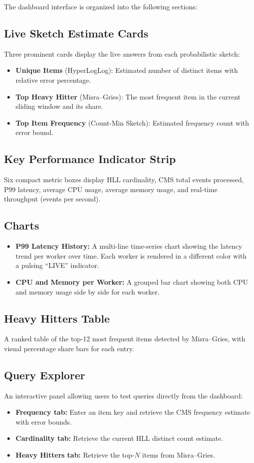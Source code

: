 The dashboard interface is organized into the following sections:

\subsection{Live Sketch Estimate Cards}
Three prominent cards display the live answers from each probabilistic sketch:
\begin{itemize}
    \item \textbf{Unique Items} (HyperLogLog): Estimated number of distinct items with relative error percentage.
    \item \textbf{Top Heavy Hitter} (Misra--Gries): The most frequent item in the current sliding window and its share.
    \item \textbf{Top Item Frequency} (Count-Min Sketch): Estimated frequency count with error bound.
\end{itemize}

\subsection{Key Performance Indicator Strip}
Six compact metric boxes display HLL cardinality, CMS total events processed, P99 latency, average CPU usage, average memory usage, and real-time throughput (events per second).

\subsection{Charts}
\begin{itemize}
    \item \textbf{P99 Latency History:} A multi-line time-series chart showing the latency trend per worker over time. Each worker is rendered in a different color with a pulsing ``LIVE'' indicator.
    \item \textbf{CPU and Memory per Worker:} A grouped bar chart showing both CPU and memory usage side by side for each worker.
\end{itemize}

\subsection{Heavy Hitters Table}
A ranked table of the top-12 most frequent items detected by Misra--Gries, with visual percentage share bars for each entry.

\subsection{Query Explorer}
An interactive panel allowing users to test queries directly from the dashboard:
\begin{itemize}
    \item \textbf{Frequency tab:} Enter an item key and retrieve the CMS frequency estimate with error bounds.
    \item \textbf{Cardinality tab:} Retrieve the current HLL distinct count estimate.
    \item \textbf{Heavy Hitters tab:} Retrieve the top-$N$ items from Misra--Gries.
\end{itemize}

